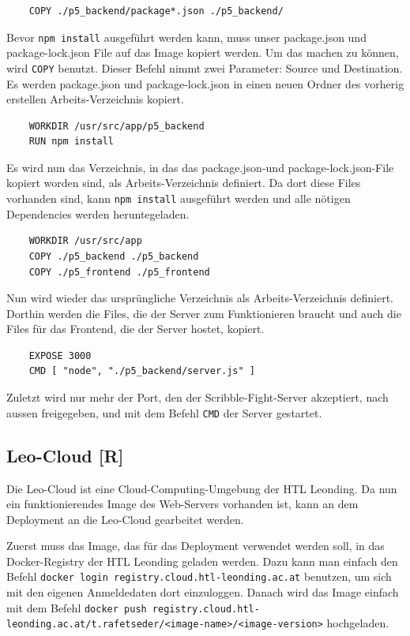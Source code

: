 \begin{lstlisting}
    COPY ./p5_backend/package*.json ./p5_backend/
\end{lstlisting}
Bevor \texttt{npm install} ausgeführt werden kann, muss unser package.json und package-lock.json File auf das Image kopiert werden.
Um das machen zu können, wird \texttt{COPY} benutzt. Dieser Befehl nimmt zwei Parameter: Source und Destination. Es werden package.json und package-lock.json in einen neuen Ordner des vorherig erstellen Arbeits-Verzeichnis kopiert. \\

\begin{lstlisting}
    WORKDIR /usr/src/app/p5_backend
    RUN npm install
\end{lstlisting}
Es wird nun das Verzeichnis, in das das package.json-und package-lock.json-File kopiert worden sind, als Arbeits-Verzeichnis definiert. 
Da dort diese Files vorhanden sind, kann \texttt{npm install} ausgeführt werden und alle nötigen Dependencies werden heruntegeladen. \\

\begin{lstlisting}
    WORKDIR /usr/src/app
    COPY ./p5_backend ./p5_backend
    COPY ./p5_frontend ./p5_frontend
\end{lstlisting}

Nun wird wieder das ursprüngliche Verzeichnis als Arbeits-Verzeichnis definiert. Dorthin werden die Files, die der Server zum Funktionieren braucht und auch die Files für das Frontend, die der Server hostet, kopiert. \\

\begin{lstlisting}
    EXPOSE 3000
    CMD [ "node", "./p5_backend/server.js" ]
\end{lstlisting}

Zuletzt wird nur mehr der Port, den der Scribble-Fight-Server akzeptiert, nach aussen freigegeben, und mit dem Befehl \texttt{CMD} der Server gestartet.

\subsection{Leo-Cloud [R]}
Die Leo-Cloud ist eine Cloud-Computing-Umgebung der HTL Leonding.
Da nun ein funktionierendes Image des Web-Servers vorhanden ist, kann an dem Deployment an die Leo-Cloud gearbeitet werden.

Zuerst muss das Image, das für das Deployment verwendet werden soll, in das Docker-Registry der HTL Leonding geladen werden. 
Dazu kann man einfach den Befehl \texttt{docker login registry.cloud.htl-leonding.ac.at} benutzen, um sich mit den eigenen Anmeldedaten dort einzuloggen.
Danach wird das Image einfach mit dem Befehl \texttt{docker push registry.cloud.htl-leonding.ac.at/t.rafetseder/<image-name>/<image-version>} hochgeladen.

